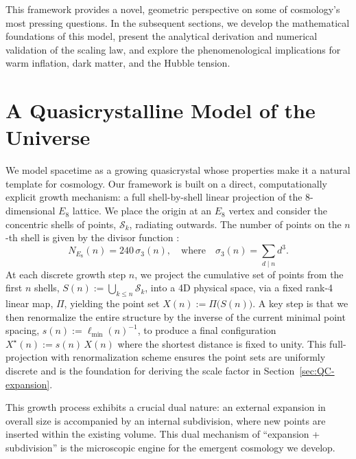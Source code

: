 \documentclass[universe,article,submit,pdftex,moreauthors]{Definitions/mdpi}
\begin{document}
This framework provides a novel, geometric perspective on some of cosmology's most pressing questions. In the subsequent sections, we develop the mathematical foundations of this model, present the analytical derivation and numerical validation of the scaling law, and explore the phenomenological implications for warm inflation, dark matter, and the Hubble tension.

\section{A Quasicrystalline Model of the Universe}
\label{sec:QCuniverse}

We model spacetime as a growing quasicrystal whose properties make it a natural template for cosmology. Our framework is built on a direct, computationally explicit growth mechanism: a full shell-by-shell linear projection of the 8-dimensional $E_8$ lattice. We place the origin at an $E_8$ vertex and consider the concentric shells of points, $\mathcal{S}_k$, radiating outwards. The number of points on the $n$-th shell is given by the divisor function \cite{ConwaySloane1988}:
\begin{equation}
    N_{E_8}(n)=240\,\sigma_{3}(n), \quad \text{where} \quad \sigma_{3}(n)=\sum_{d\mid n} d^{3}. \label{eq:NE8}
\end{equation}
At each discrete growth step $n$, we project the cumulative set of points from the first $n$ shells, $S(n):=\bigcup_{k\le n}\mathcal S_k$, into a 4D physical space, via a fixed rank-4 linear map, $\Pi$, yielding the point set $X(n):=\Pi\big(S(n)\big)$. A key step is that we then renormalize the entire structure by the inverse of the current minimal point spacing, $s(n):=\ell_{\min}(n)^{-1}$, to produce a final configuration $X^{\star}(n):=s(n)\,X(n)$ where the shortest distance is fixed to unity. This full-projection with renormalization scheme ensures the point sets are uniformly discrete and is the foundation for deriving the scale factor in Section~\ref{sec:QC-expansion}.

This growth process exhibits a crucial dual nature: an external expansion in overall size is accompanied by an internal subdivision, where new points are inserted within the existing volume. This dual mechanism of ``expansion + subdivision'' is the microscopic engine for the emergent cosmology we develop.
\end{document}
